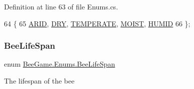 Definition at line 63 of file Enums.\+cs.


\begin{DoxyCode}
64     \{
65         \hyperlink{namespace_bee_game_1_1_enums_a66566cbc9da8d1d1e402156b4bd3bf9dacb2b7bbb0e2f3f76538306e5fa548770}{ARID}, \hyperlink{namespace_bee_game_1_1_enums_a66566cbc9da8d1d1e402156b4bd3bf9da76cca64663bcf77e11df2d5a88fc7d4b}{DRY}, \hyperlink{namespace_bee_game_1_1_enums_a9db0f9ac859fab168654d657f248b024ad5938597ebb26919bd3b131a5f076b35}{TEMPERATE}, \hyperlink{namespace_bee_game_1_1_enums_a66566cbc9da8d1d1e402156b4bd3bf9da8c810d76ac96d2a8ddfe7b859307ad1f}{MOIST}, \hyperlink{namespace_bee_game_1_1_enums_a66566cbc9da8d1d1e402156b4bd3bf9dae21803baeeb8740c4616bc69a5e35b40}{HUMID}
66     \};
\end{DoxyCode}
\mbox{\label{namespace_bee_game_1_1_enums_ae3853807ded2f4d99a0d4a7fb4b2bc46}} 
\subsubsection{\texorpdfstring{Bee\+Life\+Span}{BeeLifeSpan}}
{\footnotesize\ttfamily enum \hyperlink{namespace_bee_game_1_1_enums_ae3853807ded2f4d99a0d4a7fb4b2bc46}{Bee\+Game.\+Enums.\+Bee\+Life\+Span}\hspace{0.3cm}{\ttfamily [strong]}}



The lifespan of the bee 

